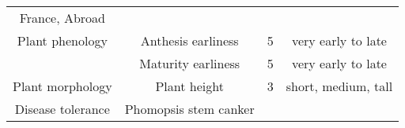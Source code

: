 \documentclass[a4paper]{article}
\begin{document}
\begin{longtable}[]{@{}cccc@{}}
\begin{minipage}[t]{0.29\columnwidth}
France, Abroad\strut
\end{minipage}\tabularnewline
\begin{minipage}[t]{0.24\columnwidth}\centering\strut
Plant phenology\strut
\end{minipage} & \begin{minipage}[t]{0.28\columnwidth}\centering\strut
Anthesis earliness\strut
\end{minipage} & \begin{minipage}[t]{0.09\columnwidth}\centering\strut
5\strut
\end{minipage} & \begin{minipage}[t]{0.29\columnwidth}\centering\strut
very early to late\strut
\end{minipage}\tabularnewline
\begin{minipage}[t]{0.24\columnwidth}\centering\strut
\strut
\end{minipage} & \begin{minipage}[t]{0.28\columnwidth}\centering\strut
Maturity earliness\strut
\end{minipage} & \begin{minipage}[t]{0.09\columnwidth}\centering\strut
5\strut
\end{minipage} & \begin{minipage}[t]{0.29\columnwidth}\centering\strut
very early to late\strut
\end{minipage}\tabularnewline
\begin{minipage}[t]{0.24\columnwidth}\centering\strut
Plant morphology\strut
\end{minipage} & \begin{minipage}[t]{0.28\columnwidth}\centering\strut
Plant height\strut
\end{minipage} & \begin{minipage}[t]{0.09\columnwidth}\centering\strut
3\strut
\end{minipage} & \begin{minipage}[t]{0.29\columnwidth}\centering\strut
short, medium, tall\strut
\end{minipage}\tabularnewline
\begin{minipage}[t]{0.24\columnwidth}\centering\strut
Disease tolerance\strut
\end{minipage} & \begin{minipage}[t]{0.28\columnwidth}\centering\strut
Phomopsis stem canker\strut
\end{minipage} & \begin{minipage}[t]{0.09\columnwidth}\centering\strut

\end{minipage}
\end{longtable}
\end{document}
